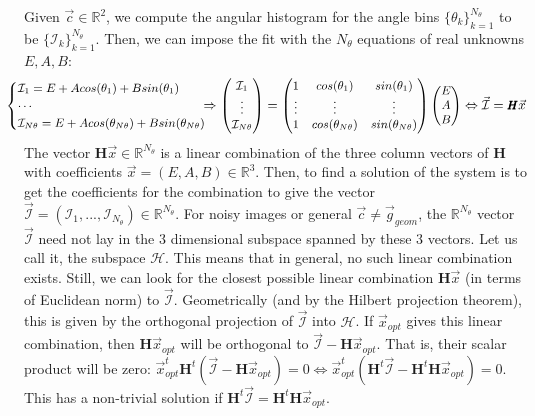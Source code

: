 \documentclass[11pt, a4paper, twoside]{article} %
\newcommand{\R}{\mathbb{R}} %
\DeclareRobustCommand{\mybox}[2][gray!10]{%
\begin{tcolorbox}[   %
        left=0.2cm,
        right=0.2cm,
        top=0.15cm,
        bottom=0.15cm,
        colback=#1,
        colframe=#1,
        width=\dimexpr\textwidth\relax, 
        enlarge left by=0mm,
        boxsep=5pt,
        arc=0pt,outer arc=0pt,
        ]
        #2
\end{tcolorbox}
}
\begin{document}
\mybox{Given $\vec{c}\in\R^2$, we compute the angular histogram for the angle bins $\{\theta_k\}_{k=1}^{N_\theta}$ to be $\{\mathcal{I}_k\}_{k=1}^{N_\theta}$. Then, we can impose the fit with the $N_\theta$ equations of real unknowns $E,A,B$:
\begin{equation}
\small
\hspace*{-0.5cm}
\begin{cases}
\mathcal{I}_1=E+Acos(\theta_1)+Bsin(\theta_1)\\
\cdots\\
\mathcal{I}_{N\theta}=E+Acos(\theta_{N\theta})+Bsin(\theta_{N\theta})
\end{cases}\hspace*{-0.5cm}\Rightarrow
\begin{pmatrix}
\mathcal{I}_1\\
\vdots\\
\mathcal{I}_{N\theta}
\end{pmatrix}=\begin{pmatrix}
1 & cos(\theta_1) & sin(\theta_1)\\
\vdots&\vdots&\vdots\\
1 & cos(\theta_{N\theta}) & sin(\theta_{N\theta})
\end{pmatrix}\begin{pmatrix}
E\\
A\\
B
\end{pmatrix}\Leftrightarrow \vec{\mathcal{I}}=\pmb{H}\vec{x}
\end{equation}
The vector $\pmb{H}\vec{x}\in\R^{N_\theta}$ is a linear combination of the three column vectors of $\pmb{H}$ with coefficients $\vec{x}=(E,A,B)\in\R^3$. Then, to find a solution of the system is to get the coefficients for the combination to give the vector $\vec{\mathcal{I}}=(\mathcal{I}_1,...,\mathcal{I}_{N_\theta})\in\R^{N_\theta}$. For noisy images or general $\vec{c}\neq \vec{g}_{geom}$, the $\R^{N_\theta}$ vector $\vec{\mathcal{I}}$ need not lay in the 3 dimensional subspace spanned by these 3 vectors. Let us call it, the subspace $\mathcal{H}$. This means that in general, no such linear combination exists. Still, we can look for the closest possible linear combination $\pmb{H}\vec{x}$ (in terms of Euclidean norm) to $\vec{\mathcal{I}}$. Geometrically (and by the Hilbert projection theorem), this is given by the orthogonal projection of $\vec{\mathcal{I}}$ into $\mathcal{H}$. If $\vec{x}_{opt}$ gives this linear combination, then $\pmb{H}\vec{x}_{opt}$ will be orthogonal to $\vec{\mathcal{I}}-\pmb{H}\vec{x}_{opt}$. That is, their scalar product will be zero: $\vec{x}_{opt}^t\pmb{H}^{t}(\vec{\mathcal{I}}-\pmb{H}\vec{x}_{opt})=0\Leftrightarrow \vec{x}_{opt}^t(\pmb{H}^t\vec{\mathcal{I}}-\pmb{H}^t\pmb{H}\vec{x}_{opt})=0$. This has a non-trivial solution if $\pmb{H}^t\vec{\mathcal{I}}=\pmb{H}^t\pmb{H}\vec{x}_{opt}$. \vspace{0.15cm}

}
\end{document}
